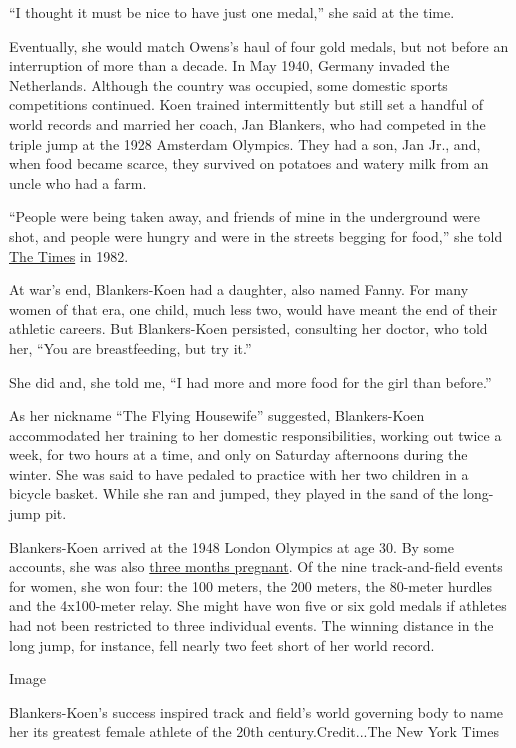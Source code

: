 ``I thought it must be nice to have just one medal,'' she said at the
time.

Eventually, she would match Owens's haul of four gold medals, but not
before an interruption of more than a decade. In May 1940, Germany
invaded the Netherlands. Although the country was occupied, some
domestic sports competitions continued. Koen trained intermittently but
still set a handful of world records and married her coach, Jan
Blankers, who had competed in the triple jump at the 1928 Amsterdam
Olympics. They had a son, Jan Jr., and, when food became scarce, they
survived on potatoes and watery milk from an uncle who had a farm.

``People were being taken away, and friends of mine in the underground
were shot, and people were hungry and were in the streets begging for
food,'' she told
\href{https://www.nytimes.com/1982/10/02/sports/players-olympian-ahead-of-her-time.html}{The
Times} in 1982.

At war's end, Blankers-Koen had a daughter, also named Fanny. For many
women of that era, one child, much less two, would have meant the end of
their athletic careers. But Blankers-Koen persisted, consulting her
doctor, who told her, ``You are breastfeeding, but try it.''

She did and, she told me, ``I had more and more food for the girl than
before.''

As her nickname ``The Flying Housewife'' suggested, Blankers-Koen
accommodated her training to her domestic responsibilities, working out
twice a week, for two hours at a time, and only on Saturday afternoons
during the winter. She was said to have pedaled to practice with her two
children in a bicycle basket. While she ran and jumped, they played in
the sand of the long-jump pit.

Blankers-Koen arrived at the 1948 London Olympics at age 30. By some
accounts, she was also
\href{https://theolympians.co/tag/fanny-blankers-koen/}{three months
pregnant}. Of the nine track-and-field events for women, she won four:
the 100 meters, the 200 meters, the 80-meter hurdles and the 4x100-meter
relay. She might have won five or six gold medals if athletes had not
been restricted to three individual events. The winning distance in the
long jump, for instance, fell nearly two feet short of her world record.

Image

Blankers-Koen's success inspired track and field's world governing body
to name her its greatest female athlete of the 20th century.Credit...The
New York Times

